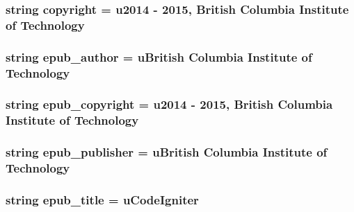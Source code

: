 \subsubsection[{copyright}]{\setlength{\rightskip}{0pt plus 5cm}string copyright = u\textquotesingle{}2014 -\/ 2015, British Columbia Institute of Technology\textquotesingle{}}\label{namespaceconf_a6ad5f3290c14149f679301b770fa13f9}
\hypertarget{namespaceconf_a65d676afa893f71bef09ae1a4f1970d2}{}
\subsubsection[{epub\+\_\+author}]{\setlength{\rightskip}{0pt plus 5cm}string epub\+\_\+author = u\textquotesingle{}British Columbia Institute of Technology\textquotesingle{}}\label{namespaceconf_a65d676afa893f71bef09ae1a4f1970d2}
\hypertarget{namespaceconf_a8ea253124c547df38571acd738c10b1f}{}
\subsubsection[{epub\+\_\+copyright}]{\setlength{\rightskip}{0pt plus 5cm}string epub\+\_\+copyright = u\textquotesingle{}2014 -\/ 2015, British Columbia Institute of Technology\textquotesingle{}}\label{namespaceconf_a8ea253124c547df38571acd738c10b1f}
\hypertarget{namespaceconf_a19616e2a147791c51388e107e7309c0f}{}
\subsubsection[{epub\+\_\+publisher}]{\setlength{\rightskip}{0pt plus 5cm}string epub\+\_\+publisher = u\textquotesingle{}British Columbia Institute of Technology\textquotesingle{}}\label{namespaceconf_a19616e2a147791c51388e107e7309c0f}
\hypertarget{namespaceconf_a1d2f113ccea013e94bb23f7339033729}{}
\subsubsection[{epub\+\_\+title}]{\setlength{\rightskip}{0pt plus 5cm}string epub\+\_\+title = u\textquotesingle{}Code\+Igniter\textquotesingle{}}\label{namespaceconf_a1d2f113ccea013e94bb23f7339033729}
\hypertarget{namespaceconf_a16535c83d9b5c141382335d79b4995b2}{}
